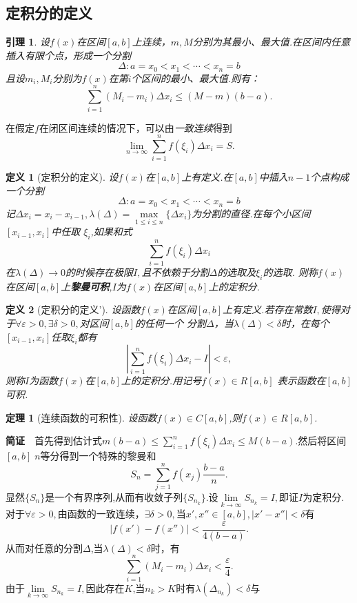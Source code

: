 \documentclass[UTF8]{article}
\newtheorem{thm}{\hspace{2em}定理}[section]
\newtheorem{lem}{\hspace{2em}引理}[section]
\newtheorem{dfn}{\hspace{2em}定义}[section]
\begin{document}
  \subsection{定积分的定义}
    \begin{lem}
      设$f(x)$在区间$[a,b]$上连续，$m,M$分别为其最小、最大值.在区间内任意插入有限个点，形成一个分割
      $$\Delta:a=x_0<x_1<\cdots<x_n=b$$
      且设$m_i,M_i$分别为$f(x)$在第$i$个区间的最小、最大值.则有：
      $$\sum_{i=1}^n(M_i-m_i)\Delta x_i\le(M-m)(b-a).$$
    \end{lem}
    在假定$f$在闭区间连续的情况下，可以由\emph{一致连续}得到
    $$\lim_{n\to\infty}\sum_{i=1}^nf(\xi_i)\Delta x_i=S.$$
    \begin{dfn}[定积分的定义]
      设$f(x)$在$[a,b]$上有定义.在$[a,b]$中插入$n-1$个点构成一个分割
      $$\Delta:a=x_0<x_1<\cdots<x_n=b$$
      记$\Delta x_i=x_i-x_{i-1},\lambda(\Delta)=\max\limits_{1\le i\le n}\{\Delta x_i\}$为分割的直径.在每个小区间$[x_{i-1},x_i]$中任取
      $\xi_i$,如果和式
      $$\sum_{i=1}^nf(\xi_i)\Delta x_i$$在$\lambda(\Delta)\to0$的时候存在极限$I,$且不依赖于分割$\Delta$的选取及$\xi_i$的选取.
      则称$f(x)$在区间$[a,b]$上\textbf{黎曼可积},$I$为$f(x)$在区间$[a,b]$上的定积分.
    \end{dfn}
    \begin{dfn}[定积分的定义']
      设函数$f(x)$在区间$[a,b]$上有定义.若存在常数$I,$使得对于$\forall\varepsilon>0,\exists\delta>0,$对区间$[a,b]$的任何一个
      分割$\Delta$，当$\lambda(\Delta)<\delta$时，在每个$[x_{i-1},x_i]$任取$\xi_i$都有
      $$\left|\sum_{i=1}^nf(\xi_i)\Delta x_i-I\right|<\varepsilon,$$则称$I$为函数$f(x)$在$[a,b]$上的定积分.用记号$f(x)\in R[a,b]$
      表示函数在$[a,b]$可积.
    \end{dfn}
    \begin{thm}[连续函数的可积性]
      设函数$f(x)\in C[a,b]$,则$f(x)\in R[a,b]$.
    \end{thm}
    \textbf{简证}$\quad$首先得到估计式$m(b-a)\le\sum_{i=1}^nf(\xi_i)\Delta x_i\le M(b-a).$然后将区间$[a,b]\;n$等分得到一个特殊的黎曼和
    $$S_n=\sum_{j=1}^nf(x_j)\frac{b-a}{n}.$$
    显然$\{S_n\}$是一个有界序列,从而有收敛子列$\{S_{n_k}\}$.设$\lim\limits_{k\to\infty}S_{n_k}=I,$即证$I$为定积分.\\
    对于$\forall\varepsilon>0,$由函数的一致连续，$\exists\delta>0,$当$x',x''\in[a,b],|x'-x''|<\delta$有
    $$|f(x')-f(x'')|<\frac{\varepsilon}{4(b-a)}.$$
    从而对任意的分割$\Delta$,当$\lambda(\Delta)<\delta$时，有
    $$\sum_{i=1}^n(M_i-m_i)\Delta x_i<\frac{\varepsilon}{4}.$$
    由于$\lim\limits_{k\to\infty}S_{n_k}=I,$因此存在$K$,当$n_k>K$时有$\lambda(\Delta_{n_k})<\delta$与
\end{document}
